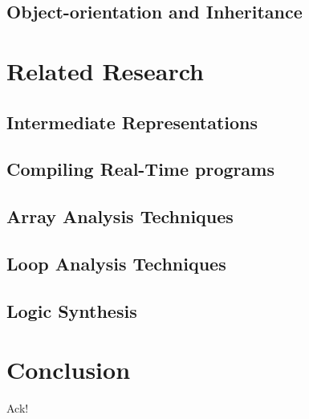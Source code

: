 \documentclass[10pt,notitlepage]{article}
\begin{document}
\subsection{Object-orientation and Inheritance}
\section{Related Research}
\subsection{Intermediate Representations}
\subsection{Compiling Real-Time programs}
\subsection{Array Analysis Techniques}
\subsection{Loop Analysis Techniques}
\subsection{Logic Synthesis}
\section{Conclusion}
Ack!

\nocite{*}

\end{document}

